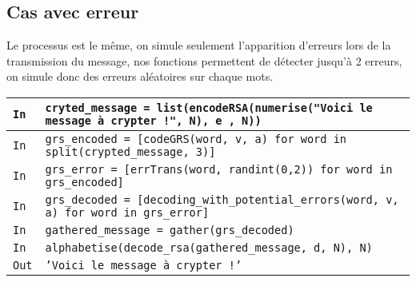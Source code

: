 \documentclass[titlepage]{article}
\begin{document}
    \subsection{Cas avec erreur}

        Le processus est le même, on simule seulement l'apparition d'erreurs lors de la transmission du message, nos fonctions permettent de détecter jusqu'à 2 erreurs, 
        on simule donc des erreurs aléatoires sur chaque mots.
        \bigbreak
    
        \begin{tabularx}{12cm}{|p{0.60cm}|X|}
            \hline
            \rowcolor{gray}
            \texttt{In}
            & 
            \texttt{cryted\_message = list(encodeRSA(numerise("Voici le message à crypter !", N), e , N))}
            \\
            \hline
            \rowcolor{gray}
            \texttt{In}
            &
            \texttt{grs\_encoded = [codeGRS(word, v, a) for word in split(crypted\_message, 3)]}
            \\
            \hline
            \rowcolor{gray}
            \texttt{In}
            &
            \texttt{grs\_error = [errTrans(word, randint(0,2)) for word in grs\_encoded]}
            \\
            \hline
            \rowcolor{gray}
            \texttt{In}
            &
            \texttt{grs\_decoded = [decoding\_with\_potential\_errors(word, v, a) for word in grs\_error]}
            \\
            \hline
            \rowcolor{gray}
            \texttt{In}
            &
            \texttt{gathered\_message = gather(grs\_decoded)}
            \\
            \hline
            \rowcolor{gray}
            \texttt{In}
            &
            \texttt{alphabetise(decode\_rsa(gathered\_message, d, N), N)}
            \\
            \hline
            \texttt{Out}
            &
            \texttt{'Voici le message à crypter !'}
            \\
            \hline
        \end{tabularx}
        \bigbreak
        
\end{document}
